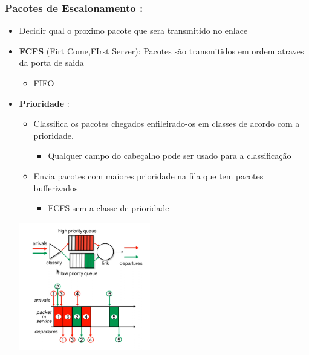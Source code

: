         \subsubsection*{Pacotes de Escalonamento :}
            \begin{itemize}[left=0.5cm, align=left, nosep]
                \item Decidir qual o proximo pacote que sera transmitido no enlace
                
                \item \textbf{FCFS} (Firt Come,FIrst Server): Pacotes são transmitidos em ordem atraves da porta de saida
                    \begin{itemize}[left=0.5cm, nosep, label=$\hookrightarrow$]    
                        \item FIFO
                    \end{itemize}

                \item \textbf{Prioridade} :
                    \begin{itemize}[left=0.5cm, nosep, label=$\hookrightarrow$]    
                        
                        \item Classifica os pacotes chegados enfileirado-os em classes de acordo com a prioridade.
                        \begin{itemize}[left=0.5cm, nosep, label=$-$] 
                            \item Qualquer campo do cabeçalho pode ser usado para a classificação
                        \end{itemize}  

                        \item Envia pacotes com maiores prioridade na fila que tem pacotes bufferizados  
                        \begin{itemize}[left=0.5cm, nosep, label=$-$] 
                            \item FCFS sem a classe de prioridade
                        \end{itemize}                     
                    
                    \end{itemize}
                     
                    \begin{center}
                        \includegraphics[width=0.45\textwidth]{img/cap-04/prioridade.png}
                    \end{center}
               

\end{itemize}
